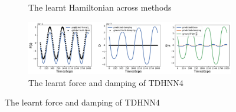 \documentclass[twoside]{article}
\begin{document}
\begin{figure}[!htb]
\begin{subfigure}[b]{0.48\textwidth}
\caption{The learnt Hamiltonian across methods}
\end{subfigure}
\begin{subfigure}[b]{0.48\textwidth}
\includegraphics[width=\textwidth]{figures/figures/relativity/1/relativity_dpdt_0.pdf}
\caption{The learnt force and damping of TDHNN4}
\end{subfigure}
\label{duffing_1_full}
\end{figure}

\pagebreak
\onecolumn
\end{document}
